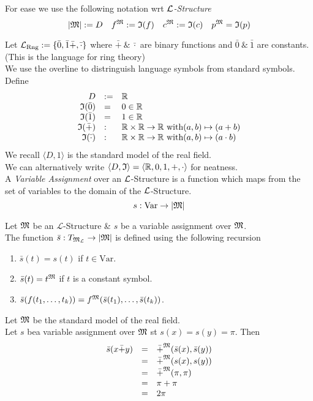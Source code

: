 \documentclass[11pt,a4paper]{article}
\begin{document}
For ease we use the following notation wrt \textit{$\mathcal{L}$-Structure}
$$|\mathfrak{M}|:=D\quad f^{\mathfrak{M}}:=\mathfrak{I}(f)\quad c^{\mathfrak{M}}:=\mathfrak{I}(c)\quad p^{\mathfrak{M}}=\mathfrak{I}(p)$$

Let $\mathcal{L}_\text{Rng}:=\{\bar0,\bar1\bar+,\bar\cdot\}$ where $\bar+\ \&\ \bar\cdot$ are binary functions and $\bar0\ \&\ \bar1$ are constants.\\
(This is the language for ring theory)\\
We use the overline to distringuish language symbols from standard symbols.\\
Define
\[\begin{array}{rll}
D&:=&\mathbb{R}\\
\mathfrak{I}(\bar0)&=&0\in\mathbb{R}\\
\mathfrak{I}(\bar1)&=&1\in\mathbb{R}\\
\mathfrak{I}(\bar+)&:&\mathbb{R}\times\mathbb{R}\to\mathbb{R}\text{ with} (a,b)\mapsto(a+b)\\
\mathfrak{I}(\bar\cdot)&:&\mathbb{R}\times\mathbb{R}\to\mathbb{R}\text{ with} (a,b)\mapsto(a\cdot b)
\end{array}\]
We recall $\langle D,\mathfrak{1}\rangle$ is the standard model of the real field.\\
\nb We can alternatively write $\langle D,\mathfrak{I}\rangle=\langle\mathbb{R},0,1,+,\cdot\rangle$ for neatness.\\

A \textit{Variable Assignment} over an $\mathcal{L}$-Structure is a function which maps from the set of variables to the domain of the $\mathcal{L}$-Structure.
$$s:\text{Var}\to|\mathfrak{M}|$$

Let $\mathfrak{M}$ be an $\mathcal{L}$-Structure \& $s$ be a variable assignment over $\mathfrak{M}$.\\
The function $\bar{s}:T_{\mathfrak{M}_\mathcal{L}}\to|\mathfrak{M}|$ is defined using the following recursion
\begin{enumerate}
	\item $\bar{s}(t)=s(t)$ if $t\in\text{Var}$.
	\item $\bar{s}(t)=t^{\mathfrak{M}}$ if $t$ is a constant symbol.
	\item $\bar{s}(f(t_1,\dots,t_k))=f^{\mathfrak{M}}(\bar{s}(t_1),\dots,\bar{s}(t_k))$.
\end{enumerate}

Let $\mathfrak{M}$ be the standard model of the real field.\\
Let $s$ bea variable assignment over $\mathfrak{M}$ st $s(x)=s(y)=\pi$. Then
\[\begin{array}{rcl}
\bar{s}(x\bar+y)&=&\bar+^{\mathfrak{M}}(\bar{s}(x),\bar{s}(y))\\
&=&\bar+^{\mathfrak{M}}(s(x),s(y))\\
&=&\bar+^{\mathfrak{M}}(\pi,\pi)\\
&=&\pi+\pi\\
&=&2\pi
\end{array}\]
\end{document}
